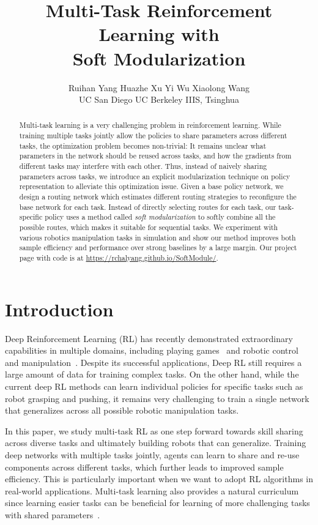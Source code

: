 \documentclass{article}
\title{Multi-Task Reinforcement Learning with \\ Soft Modularization}
\author{
    Ruihan Yang
    \quad Huazhe Xu
    \quad Yi Wu
    \quad Xiaolong Wang \\
    {UC San Diego 
    \qquad  UC Berkeley 
    \qquad  IIIS, Tsinghua }\\
}
\begin{document}
\maketitle


\begin{abstract}

Multi-task learning is a very challenging problem in reinforcement learning. While training multiple tasks jointly allow the policies to share parameters across different tasks, the optimization problem becomes non-trivial:  It remains unclear what parameters in the network should be reused across tasks, and how the gradients from different tasks may interfere with each other. Thus, instead of naively sharing parameters across tasks, we introduce an explicit modularization technique on policy representation to alleviate this optimization issue. Given a base policy network, we design a routing network which estimates different routing strategies to reconfigure the base network for each task. Instead of directly selecting routes for each task, our task-specific policy uses a method called \emph{soft modularization} to softly combine all the possible routes, which makes it suitable for sequential tasks. 
We experiment with various robotics manipulation tasks in simulation and show our method improves both sample efficiency and performance over strong baselines by a large margin. Our project page with code is at  \url{https://rchalyang.github.io/SoftModule/}.

\end{abstract} 
\vspace{-0.1in}
\section{Introduction}\label{sec:intro}
\vspace{-0.1in}

Deep Reinforcement Learning (RL) has recently demonstrated extraordinary capabilities in multiple domains, including playing games~\cite{mnih2013playing} and robotic control and manipulation~\cite{lillicrap2015continuous,levine2016end}. Despite its successful applications, 
Deep RL still requires a large amount of data for training complex tasks.
On the other hand, while the current deep RL methods can learn individual policies for specific tasks such as robot grasping and pushing, it remains very challenging to train a single network that generalizes across all possible robotic manipulation tasks. 

In this paper, we study multi-task RL as one step forward towards skill sharing across diverse tasks and ultimately building robots that can generalize. Training deep networks with multiple tasks jointly, agents can learn to share and re-use components across different tasks, which further leads to improved sample efficiency. This is particularly important when we want to adopt RL algorithms in real-world applications. Multi-task learning also provides a natural curriculum since learning easier tasks can be beneficial for learning of more challenging tasks with shared parameters~\cite{pinto2017learning}. 
\end{document}
